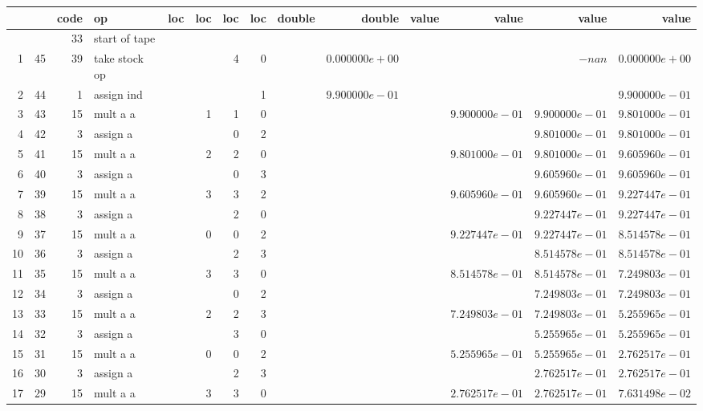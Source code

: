 \documentclass{article}
\begin{document}
\tiny
\begin{tabular}{|r|r|r|l|r|r|r|r||r|r||r|r|r|r|} \hline 
 & & code & op & loc & loc & loc & loc & double & double & value & value & value & value \\ \hline 
 & & 33 & start of tape & & & & & & & & & &  \\ \hline 
1 & 45 & 39 & take stock op & & & 4 & 0 & &$ 0.000000e+00 $& & &$ -nan $&$ 0.000000e+00 $\\ \hline 
2 & 44 & 1 & assign ind & & & & 1 & &$ 9.900000e-01 $& & & &$ 9.900000e-01 $\\ \hline 
3 & 43 & 15 & mult a a & & 1 & 1 & 0 & & & &$ 9.900000e-01 $&$ 9.900000e-01 $&$ 9.801000e-01 $\\ \hline 
4 & 42 & 3 & assign a & & & 0 & 2 & & & & &$ 9.801000e-01 $&$ 9.801000e-01 $\\ \hline 
5 & 41 & 15 & mult a a & & 2 & 2 & 0 & & & &$ 9.801000e-01 $&$ 9.801000e-01 $&$ 9.605960e-01 $\\ \hline 
6 & 40 & 3 & assign a & & & 0 & 3 & & & & &$ 9.605960e-01 $&$ 9.605960e-01 $\\ \hline 
7 & 39 & 15 & mult a a & & 3 & 3 & 2 & & & &$ 9.605960e-01 $&$ 9.605960e-01 $&$ 9.227447e-01 $\\ \hline 
8 & 38 & 3 & assign a & & & 2 & 0 & & & & &$ 9.227447e-01 $&$ 9.227447e-01 $\\ \hline 
9 & 37 & 15 & mult a a & & 0 & 0 & 2 & & & &$ 9.227447e-01 $&$ 9.227447e-01 $&$ 8.514578e-01 $\\ \hline 
10 & 36 & 3 & assign a & & & 2 & 3 & & & & &$ 8.514578e-01 $&$ 8.514578e-01 $\\ \hline 
11 & 35 & 15 & mult a a & & 3 & 3 & 0 & & & &$ 8.514578e-01 $&$ 8.514578e-01 $&$ 7.249803e-01 $\\ \hline 
12 & 34 & 3 & assign a & & & 0 & 2 & & & & &$ 7.249803e-01 $&$ 7.249803e-01 $\\ \hline 
13 & 33 & 15 & mult a a & & 2 & 2 & 3 & & & &$ 7.249803e-01 $&$ 7.249803e-01 $&$ 5.255965e-01 $\\ \hline 
14 & 32 & 3 & assign a & & & 3 & 0 & & & & &$ 5.255965e-01 $&$ 5.255965e-01 $\\ \hline 
15 & 31 & 15 & mult a a & & 0 & 0 & 2 & & & &$ 5.255965e-01 $&$ 5.255965e-01 $&$ 2.762517e-01 $\\ \hline 
16 & 30 & 3 & assign a & & & 2 & 3 & & & & &$ 2.762517e-01 $&$ 2.762517e-01 $\\ \hline 
17 & 29 & 15 & mult a a & & 3 & 3 & 0 & & & &$ 2.762517e-01 $&$ 2.762517e-01 $&$ 7.631498e-02 $\\ \hline 

\end{tabular}
\end{document}
